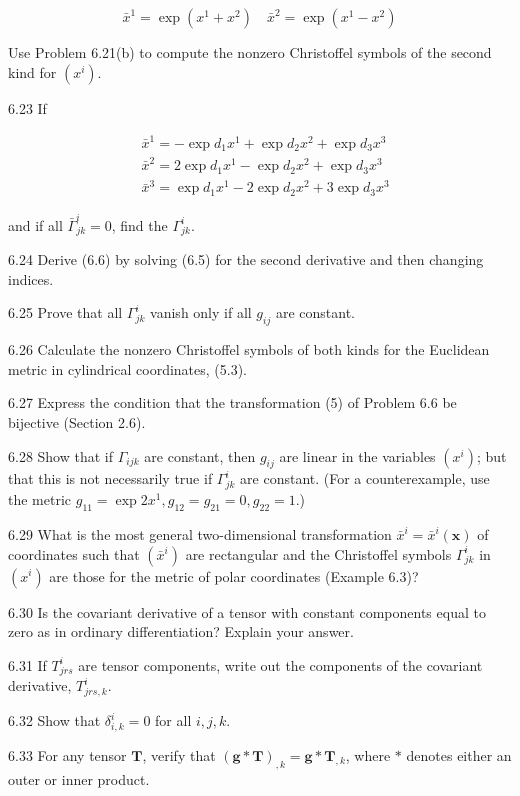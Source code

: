 \documentclass[10pt]{article}
\begin{document}
$$
\bar{x}^{1}=\exp \left(x^{1}+x^{2}\right) \quad \bar{x}^{2}=\exp \left(x^{1}-x^{2}\right)
$$

Use Problem 6.21(b) to compute the nonzero Christoffel symbols of the second kind for $\left(x^{i}\right)$.

6.23 If

$$
\begin{aligned}
& \bar{x}^{1}=-\exp d_{1} x^{1}+\exp d_{2} x^{2}+\exp d_{3} x^{3} \\
& \bar{x}^{2}=2 \exp d_{1} x^{1}-\exp d_{2} x^{2}+\exp d_{3} x^{3} \\
& \bar{x}^{3}=\exp d_{1} x^{1}-2 \exp d_{2} x^{2}+3 \exp d_{3} x^{3}
\end{aligned}
$$

and if all $\bar{\Gamma}_{j k}^{i}=0$, find the $\Gamma_{j k}^{i}$.

6.24 Derive (6.6) by solving (6.5) for the second derivative and then changing indices.

6.25 Prove that all $\Gamma_{j k}^{i}$ vanish only if all $g_{i j}$ are constant.

6.26 Calculate the nonzero Christoffel symbols of both kinds for the Euclidean metric in cylindrical coordinates, (5.3).

6.27 Express the condition that the transformation (5) of Problem 6.6 be bijective (Section 2.6).

6.28 Show that if $\Gamma_{i j k}$ are constant, then $g_{i j}$ are linear in the variables $\left(x^{i}\right)$; but that this is not necessarily true if $\Gamma_{j k}^{i}$ are constant. (For a counterexample, use the metric $g_{11}=\exp 2 x^{1}, g_{12}=g_{21}=0, g_{22}=1$.)

6.29 What is the most general two-dimensional transformation $\bar{x}^{i}=\bar{x}^{i}(\mathbf{x})$ of coordinates such that $\left(\bar{x}^{i}\right)$ are rectangular and the Christoffel symbols $\Gamma_{j k}^{i}$ in $\left(x^{i}\right)$ are those for the metric of polar coordinates (Example 6.3)?

6.30 Is the covariant derivative of a tensor with constant components equal to zero as in ordinary differentiation? Explain your answer.

6.31 If $T_{j r s}^{i}$ are tensor components, write out the components of the covariant derivative, $T_{j r s, k}^{i}$.

6.32 Show that $\delta_{i, k}^{i}=0$ for all $i, j, k$.

6.33 For any tensor $\mathbf{T}$, verify that $(\mathbf{g} * \mathbf{T})_{, k}=\mathbf{g} * \mathbf{T}{ }_{, k}$, where $*$ denotes either an outer or inner product.
\end{document}
